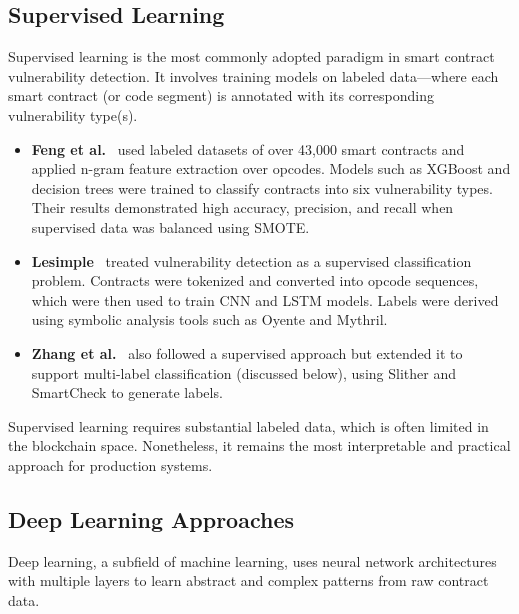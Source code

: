 \subsection*{Supervised Learning}
Supervised learning is the most commonly adopted paradigm in smart contract vulnerability detection. It involves training models on labeled data—where each smart contract (or code segment) is annotated with its corresponding vulnerability type(s).

\begin{itemize}
    \item \textbf{Feng et al.}~\cite{feng2024interpretable} used labeled datasets of over 43,000 smart contracts and applied n-gram feature extraction over opcodes. Models such as XGBoost and decision trees were trained to classify contracts into six vulnerability types. Their results demonstrated high accuracy, precision, and recall when supervised data was balanced using SMOTE.
    
    \item \textbf{Lesimple}~\cite{lesimple2020master} treated vulnerability detection as a supervised classification problem. Contracts were tokenized and converted into opcode sequences, which were then used to train CNN and LSTM models. Labels were derived using symbolic analysis tools such as Oyente and Mythril.
    
    \item \textbf{Zhang et al.}~\cite{zhang2020scvd} also followed a supervised approach but extended it to support multi-label classification (discussed below), using Slither and SmartCheck to generate labels.
\end{itemize}

Supervised learning requires substantial labeled data, which is often limited in the blockchain space. Nonetheless, it remains the most interpretable and practical approach for production systems.

\subsection*{Deep Learning Approaches}

Deep learning, a subfield of machine learning, uses neural network architectures with multiple layers to learn abstract and complex patterns from raw contract data.

